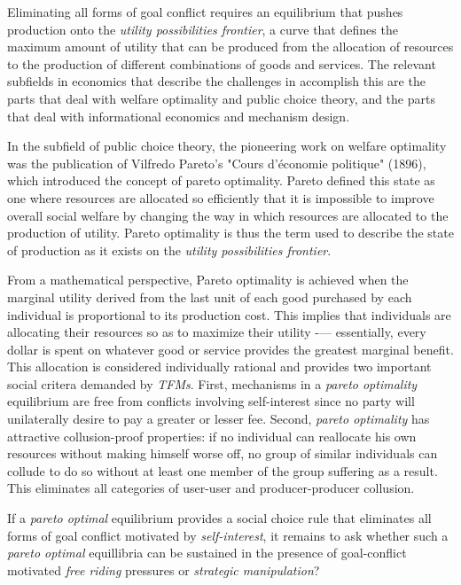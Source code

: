 
Eliminating all forms of goal conflict requires an equilibrium that pushes production onto the \textit{utility possibilities frontier}, a curve that defines the maximum amount of utility that can be produced from the allocation of resources to the production of different combinations of goods and services. The relevant subfields in economics that describe the challenges in accomplish this are the parts that deal with welfare optimality and public choice theory, and the parts that deal with informational economics and mechanism design.

In the subfield of public choice theory, the pioneering work on welfare optimality was the publication of Vilfredo Pareto’s "Cours d'économie politique" (1896), which introduced the concept of pareto optimality. Pareto defined this state as one where resources are allocated so efficiently that it is impossible to improve overall social welfare by changing the way in which resources are allocated to the production of utility. Pareto optimality is thus the term used to describe the state of production as it exists on the \textit{utility possibilities frontier}.

From a mathematical perspective, Pareto optimality is achieved when the marginal utility derived from the last unit of each good purchased by each individual is proportional to its production cost. This implies that individuals are allocating their resources so as to maximize their utility -— essentially, every dollar is spent on whatever good or service provides the greatest marginal benefit. This allocation is considered individually rational and provides two important social critera demanded by \textit{TFMs}. First, mechanisms in a \textit{pareto optimality} equilibrium are free from conflicts involving self-interest since no party will unilaterally desire to pay a greater or lesser fee. Second, \textit{pareto optimality} has attractive collusion-proof properties: if no individual can reallocate his own resources without making himself worse off, no group of similar individuals can collude to do so without at least one member of the group suffering as a result. This eliminates all categories of user-user and producer-producer collusion.

If a \textit{pareto optimal} equilibrium provides a social choice rule that eliminates all forms of goal conflict motivated by \textit{self-interest}, it remains to ask whether such a \textit{pareto optimal} equillibria can be sustained in the presence of goal-conflict motivated \textit{free riding} pressures or \textit{strategic manipulation}?

